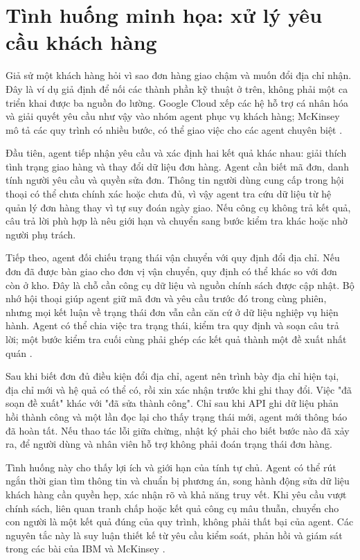 \documentclass[12pt,a4paper]{report}
\begin{document}
\section{Tình huống minh họa: xử lý yêu cầu khách hàng}
Giả sử một khách hàng hỏi vì sao đơn hàng giao chậm và muốn đổi địa chỉ nhận. Đây
là ví dụ giả định để nối các thành phần kỹ thuật ở trên, không phải một ca triển
khai được ba nguồn đo lường. Google Cloud xếp các hệ hỗ trợ cá nhân hóa và giải
quyết yêu cầu như vậy vào nhóm agent phục vụ khách hàng; McKinsey mô tả các quy
trình có nhiều bước, có thể giao việc cho các agent chuyên biệt \cite{google,mckinsey}.

Đầu tiên, agent tiếp nhận yêu cầu và xác định hai kết quả khác nhau: giải thích
tình trạng giao hàng và thay đổi dữ liệu đơn hàng. Agent cần biết mã đơn, danh tính
người yêu cầu và quyền sửa đơn. Thông tin người dùng cung cấp trong hội thoại có
thể chưa chính xác hoặc chưa đủ, vì vậy agent tra cứu dữ liệu từ hệ quản lý đơn
hàng thay vì tự suy đoán ngày giao. Nếu công cụ không trả kết quả, câu trả lời phù
hợp là nêu giới hạn và chuyển sang bước kiểm tra khác hoặc nhờ người phụ trách.

Tiếp theo, agent đối chiếu trạng thái vận chuyển với quy định đổi địa chỉ. Nếu đơn
đã được bàn giao cho đơn vị vận chuyển, quy định có thể khác so với đơn còn ở kho.
Đây là chỗ cần công cụ dữ liệu và nguồn chính sách được cập nhật. Bộ nhớ hội thoại
giúp agent giữ mã đơn và yêu cầu trước đó trong cùng phiên, nhưng mọi kết luận về
trạng thái đơn vẫn cần căn cứ ở dữ liệu nghiệp vụ hiện hành. Agent có thể chia việc
tra trạng thái, kiểm tra quy định và soạn câu trả lời; một bước kiểm tra cuối cùng
phải ghép các kết quả thành một đề xuất nhất quán \cite{ibm,mckinsey}.

Sau khi biết đơn đủ điều kiện đổi địa chỉ, agent nên trình bày địa chỉ hiện tại,
địa chỉ mới và hệ quả có thể có, rồi xin xác nhận trước khi ghi thay đổi. Việc
"đã soạn đề xuất" khác với "đã sửa thành công". Chỉ sau khi API ghi dữ liệu phản
hồi thành công và một lần đọc lại cho thấy trạng thái mới, agent mới thông báo đã
hoàn tất. Nếu thao tác lỗi giữa chừng, nhật ký phải cho biết bước nào đã xảy ra,
để người dùng và nhân viên hỗ trợ không phải đoán trạng thái đơn hàng.

Tình huống này cho thấy lợi ích và giới hạn của tính tự chủ. Agent có thể rút ngắn
thời gian tìm thông tin và chuẩn bị phương án, song hành động sửa dữ liệu khách
hàng cần quyền hẹp, xác nhận rõ và khả năng truy vết. Khi yêu cầu vượt chính sách,
liên quan tranh chấp hoặc kết quả công cụ mâu thuẫn, chuyển cho con người là một
kết quả đúng của quy trình, không phải thất bại của agent. Các nguyên tắc này là
suy luận thiết kế từ yêu cầu kiểm soát, phản hồi và giám sát trong các bài của IBM
và McKinsey \cite{ibm,mckinsey}.
\end{document}
